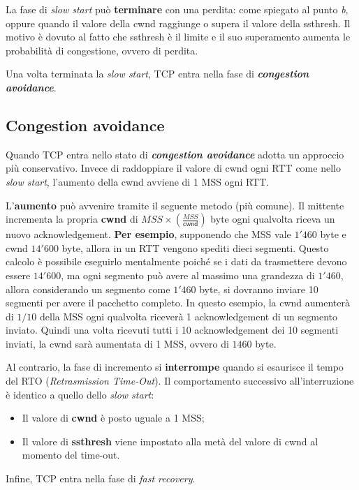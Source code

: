 \documentclass[a4paper]{article}
\begin{document}
	\noindent
	La fase di \emph{slow start} può \textbf{terminare} con una perdita: come spiegato al punto \emph{b}, oppure quando il valore della \textsf{cwnd} raggiunge o supera il valore della \textsf{ssthresh}. Il motivo è dovuto al fatto che \textsf{ssthresh} è il limite e il suo superamento aumenta le probabilità di congestione, ovvero di perdita.\newline
	
	\noindent
	Una volta terminata la \emph{slow start}, TCP entra nella fase di \textbf{\emph{congestion avoidance}}.\newpage
	
	\subsection{Congestion avoidance}
	
	Quando TCP entra nello stato di \textcolor{Red3}{\textbf{\emph{congestion avoidance}}} adotta un approccio più conservativo. Invece di raddoppiare il valore di \textsf{cwnd} ogni RTT come nello \emph{slow start}, l’aumento della \textsf{cwnd} avviene di 1 MSS ogni RTT.\newline
	
	\noindent
	L'\textbf{aumento} può avvenire tramite il seguente metodo (più comune).\newline
	Il mittente incrementa la propria \textbf{cwnd} di $MSS \times \left(\frac{MSS}{\textsf{cwnd}}\right)$ byte ogni qualvolta riceva un nuovo acknowledgement.\newline
	\textcolor{Green4}{\textbf{Per esempio}}, supponendo che MSS vale $1'460$ byte e \textsf{cwnd} $14'600$ byte, allora in un RTT vengono spediti dieci segmenti. Questo calcolo è possibile eseguirlo mentalmente poiché se i dati da trasmettere devono essere $14'600$, ma ogni segmento può avere al massimo una grandezza di $1'460$, allora considerando un segmento come $1'460$ byte, si dovranno inviare 10 segmenti per avere il pacchetto completo.\newline
	In questo esempio, la \textsf{cwnd} aumenterà di $1/10$ della MSS ogni qualvolta riceverà 1 acknowledgement di un segmento inviato. Quindi una volta ricevuti tutti i 10 acknowledgement dei 10 segmenti inviati, la \textsf{cwnd} sarà aumentata di 1 MSS, ovvero di $1460$ byte.\newline
	
	\noindent
	Al contrario, la fase di incremento si \textbf{interrompe} quando si esaurisce il tempo del RTO (\emph{Retrasmission Time-Out}). Il comportamento successivo all’interruzione è identico a quello dello \emph{slow start}:
	\begin{itemize}
		\item Il valore di \textsf{\textbf{cwnd}} è posto uguale a 1 MSS;
		\item Il valore di \textsf{\textbf{ssthresh}} viene impostato alla metà del valore di \textsf{cwnd} al momento del time-out.
	\end{itemize}
	Infine, TCP entra nella fase di \emph{fast recovery}.
	
\end{document}
